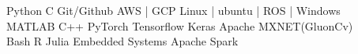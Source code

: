 


Python \textbullet{} C  \hspace{160} Git/Github \textbullet{} AWS | GCP \textbullet{} Linux | ubuntu | ROS | Windows\\
MATLAB \textbullet{} C++ \hspace{148} PyTorch \textbullet{} Tensorflow \textbullet{} Keras \textbullet{} Apache MXNET(GluonCv) \\
Bash \textbullet{} R \textbullet{} Julia \hspace{147} Embedded Systems \textbullet{} Apache Spark \\
 



